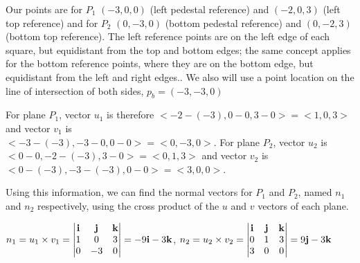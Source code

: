 \documentclass{article}
\begin{document}
\par\noindent\large Our points are for $P_{1}$ $(-3, 0, 0)$ (left pedestal reference) and $(-2, 0, 3)$ (left top reference) and for $P_{2}$ $(0, -3, 0)$ (bottom pedestal reference) and $(0, -2, 3)$ (bottom top reference).  The left reference points are on the left edge of each square, but equidistant from the top and bottom edges; the same concept applies for the bottom reference points, where they are on the bottom edge, but equidistant from the left and right edges.\vspace{0.25cm}.  We also will use a point location on the line of intersection of both sides, $p_{b} = (-3, -3, 0)$

\par\noindent\large For plane $P_{1}$, vector $u_{1}$ is therefore $<-2 - (-3), 0 - 0, 3 - 0> = <1, 0, 3>$ and vector $v_{1}$ is\\ $<-3 - (-3), -3 - 0, 0 - 0> = <0, -3, 0>$.  For plane $P_{2}$, vector $u_{2}$ is $<0 - 0, -2 - (-3), 3 - 0> = <0, 1, 3>$ and vector $v_{2}$ is $<0 - (-3), -3 - (-3), 0 - 0> = <3, 0, 0>$.\vspace{0.25cm}

\par\noindent\large Using this information, we can find the normal vectors for $P_{1}$ and $P_{2}$, named $n_{1}$ and $n_{2}$ respectively, using the cross product of the $u$ and $v$ vectors of each plane. \vspace{0.25cm}

\par\noindent\large \begin{center}$n_{1} = u_{1} \times v_{1} = \begin{vmatrix}
\textbf{i} & \textbf{j} & \textbf{k} \\ 
1 & 0 & 3 \\ 
0 & -3 & 0  \notag
\end{vmatrix} = -9\textbf{i} - 3\textbf{k}$, $n_{2} = u_{2} \times v_{2} = \begin{vmatrix}
\textbf{i} & \textbf{j} & \textbf{k} \\ 
0 & 1 & 3 \\ 
3 & 0 & 0  \notag
\end{vmatrix} = 9\textbf{j} - 3\textbf{k}$ \end{center}\vspace{0.25cm}
\end{document}
